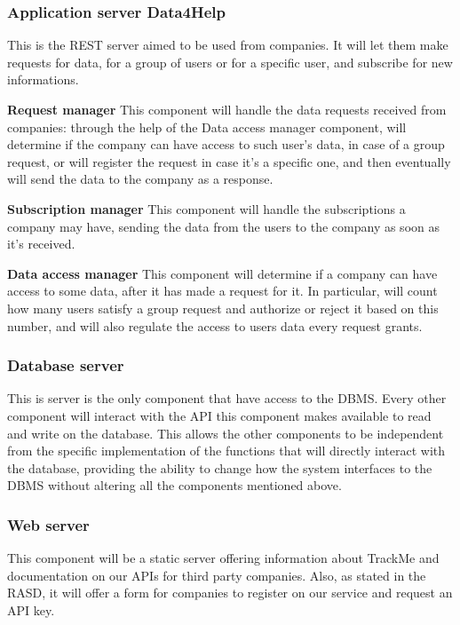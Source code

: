 \documentclass[../main.tex]{subfiles}
\begin{document}
\subsubsection{Application server Data4Help} This is the REST server aimed to be used from companies. It will let them make requests for data, for a group of users or for a specific user, and subscribe for new informations.

\begin{description}

	\item{\bf Request manager} This component will handle the data requests received from companies: through the help of the Data access manager component, will determine if the company can have access to such user's data, in case of a group request, or will register the request in case it's a specific one, and then eventually will send the data to the company as a response.

	\item{\bf Subscription manager} This component will handle the subscriptions a company may have, sending the data from the users to the company as soon as it's received.

	\item{\bf Data access manager} This component will determine if a company can have access to some data, after it has made a request for it. In particular, will count how many users satisfy a group request and authorize or reject it based on this number, and will also regulate the access to users data every request grants.

\end{description}

\subsubsection{Database server} This is server is the only component that have access to the DBMS. Every other component will interact with the API this component makes available to read and write on the database. This allows the other components to be independent from the specific implementation of the functions that will directly interact with the database, providing the ability to change how the system interfaces to the DBMS without altering all the components mentioned above.

\subsubsection{Web server} This component will be a static server offering information about TrackMe and documentation on our APIs for third party companies. Also, as stated in the RASD, it will offer a form for companies to register on our service and request an API key.
\end{document}
